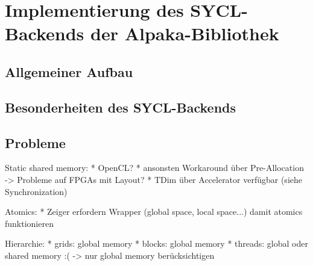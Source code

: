 \chapter{Implementierung des SYCL-Backends der Alpaka-Bibliothek}\label{implementierung}

\section{Allgemeiner Aufbau}\label{implementierung:aufbau}

\section{Besonderheiten des SYCL-Backends}\label{implementierung:besonderheiten}

\section{Probleme}\label{implementierung:probleme}

Static shared memory:
    * OpenCL?
    * ansonsten Workaround über Pre-Allocation -> Probleme auf FPGAs mit Layout?
    * TDim über Accelerator verfügbar (siehe Synchronization)

Atomics:
    * Zeiger erfordern Wrapper (global space, local space...) damit atomics
      funktionieren

Hierarchie:
    * grids: global memory
    * blocks: global memory
    * threads: global oder shared memory :( -> nur global memory berücksichtigen
